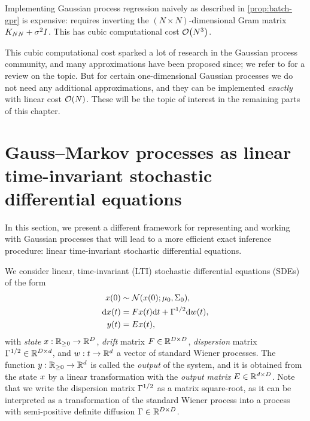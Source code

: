 \documentclass{mimosis}
\begin{document}
\begin{remark}
Implementing Gaussian process regression naively as described in \cref{prop:batch-gpr} is expensive:
requires inverting the \((N \times N)\)-dimensional Gram matrix \(K_{NN} + \sigma^2 I\).
This has cubic computational cost \(\order{N^3}\).
\end{remark}

This cubic computational cost sparked a lot of research in the Gaussian process community, and many approximations have been proposed since;
we refer to \textcite{liu2020gpreview} for a review on the topic.
But for certain one-dimensional Gaussian processes we do not need any additional approximations, and they can be implemented \emph{exactly} with linear cost \(\order{N}\).
These will be the topic of interest in the remaining parts of this chapter.
\section{Gauss--Markov processes as linear time-invariant stochastic differential equations}
\label{sec:orgea8c00b}
\label{sec:lti-sdes}
In this section, we present a different framework for representing and working with Gaussian processes that will lead to a more efficient exact inference procedure: linear time-invariant stochastic differential equations.

We consider linear, time-invariant (LTI) stochastic differential equations (SDEs)
\parencite{sarkka_solin_2019,oksendal2013stochastic}
of the form
\begin{subequations}
\label{eq:gmp:ltisde}
\begin{align}
\st(0) &\sim \N( \st(0); \mean{0}, \cov{0} ),
\label{eq:gmp:ltisde:initialdistribution} \\
\dd \st(t) &= \drift \st(t) \dd t + \disp \dd \wiener(t),
\label{eq:gmp:ltisde:sde} \\
\val(t) &= \outA \st(t),
\label{eq:gmp:ltisde:output}
\end{align}
\end{subequations}
with \emph{state} \(x: \mathbb{R}_{\geq0} \to \mathbb{R}^D\),
\emph{drift} matrix \(F \in \mathbb{R}^{D \times D}\),
\emph{dispersion} matrix \(\Gamma^{1/2} \in \mathbb{R}^{D \times d}\),
and \(w: t \to \mathbb{R}^d\) a vector of standard Wiener processes.
The function \(y: \mathbb{R}_{\geq0} \to \mathbb{R}^d\)
is called the \emph{output} of the system, and it is obtained from the state
\(x\)
by a linear transformation with the \emph{output matrix}
\(E \in \mathbb{R}^{d \times D}\).
Note that we write the dispersion matrix \(\Gamma^{1/2}\) as a matrix square-root, as it can be interpreted as a transformation of the standard Wiener process into a process with semi-positive definite diffusion \(\Gamma \in \mathbb{R}^{D \times D}\).
\end{document}
